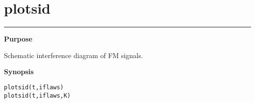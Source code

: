 


\section*{\hspace*{-1.6cm} plotsid}

\vspace*{-.4cm}
\hspace*{-1.6cm}\rule[0in]{16.5cm}{.02cm}
\vspace*{.2cm}



{\bf \large \sf Purpose}\\
\hspace*{1.5cm}
\begin{minipage}[t]{13.5cm}
Schematic interference diagram of FM signals. 
\end{minipage}
\vspace*{.5cm}


{\bf \large \sf Synopsis}\\
\hspace*{1.5cm}
\begin{minipage}[t]{13.5cm}
\begin{verbatim}
plotsid(t,iflaws)
plotsid(t,iflaws,K)
\end{verbatim}
\end{minipage}
\vspace*{.5cm}


